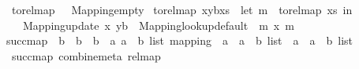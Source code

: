 \begin{isabellebody}
\ \ {\isachardoublequoteopen}to{\isacharunderscore}{\kern0pt}rel{\isacharunderscore}{\kern0pt}map\ {\isacharbrackleft}{\kern0pt}{\isacharbrackright}{\kern0pt}\ {\isacharequal}{\kern0pt}\ Mapping{\isachardot}{\kern0pt}empty{\isachardoublequoteclose}\isanewline
{\isacharbar}{\kern0pt}\ {\isachardoublequoteopen}to{\isacharunderscore}{\kern0pt}rel{\isacharunderscore}{\kern0pt}map\ {\isacharparenleft}{\kern0pt}{\isacharparenleft}{\kern0pt}{\isacharparenleft}{\kern0pt}x{\isacharcomma}{\kern0pt}y{\isacharparenright}{\kern0pt}{\isacharcomma}{\kern0pt}b{\isacharparenright}{\kern0pt}{\isacharhash}{\kern0pt}xs{\isacharparenright}{\kern0pt}\ {\isacharequal}{\kern0pt}\ {\isacharparenleft}{\kern0pt}let\ m\ {\isacharequal}{\kern0pt}\ to{\isacharunderscore}{\kern0pt}rel{\isacharunderscore}{\kern0pt}map\ xs\ in\isanewline
\ \ \ \ Mapping{\isachardot}{\kern0pt}update\ x\ {\isacharparenleft}{\kern0pt}{\isacharparenleft}{\kern0pt}y{\isacharcomma}{\kern0pt}b{\isacharparenright}{\kern0pt}\ {\isacharhash}{\kern0pt}\ Mapping{\isachardot}{\kern0pt}lookup{\isacharunderscore}{\kern0pt}default\ {\isacharbrackleft}{\kern0pt}{\isacharbrackright}{\kern0pt}\ m\ x{\isacharparenright}{\kern0pt}\ m{\isacharparenright}{\kern0pt}{\isachardoublequoteclose}\isanewline
\isanewline
{}\isamarkupfalse%
\ succ{\isacharunderscore}{\kern0pt}map\ {\isacharcolon}{\kern0pt}{\isacharcolon}{\kern0pt}\ {\isachardoublequoteopen}{\isacharparenleft}{\kern0pt}{\isacharprime}{\kern0pt}b\ {\isasymRightarrow}\ {\isacharprime}{\kern0pt}b\ {\isasymRightarrow}\ {\isacharprime}{\kern0pt}b{\isacharparenright}{\kern0pt}\ {\isasymRightarrow}\ {\isacharparenleft}{\kern0pt}{\isacharprime}{\kern0pt}a{\isacharcomma}{\kern0pt}\ {\isacharparenleft}{\kern0pt}{\isacharprime}{\kern0pt}a\ {\isacharasterisk}{\kern0pt}\ {\isacharprime}{\kern0pt}b{\isacharparenright}{\kern0pt}\ list{\isacharparenright}{\kern0pt}\ mapping\ {\isasymRightarrow}\ {\isacharparenleft}{\kern0pt}{\isacharparenleft}{\kern0pt}{\isacharprime}{\kern0pt}a\ {\isacharasterisk}{\kern0pt}\ {\isacharprime}{\kern0pt}a{\isacharparenright}{\kern0pt}\ {\isacharasterisk}{\kern0pt}\ {\isacharprime}{\kern0pt}b{\isacharparenright}{\kern0pt}\ list\ {\isasymRightarrow}\ {\isacharparenleft}{\kern0pt}{\isacharparenleft}{\kern0pt}{\isacharprime}{\kern0pt}a\ {\isacharasterisk}{\kern0pt}\ {\isacharprime}{\kern0pt}a{\isacharparenright}{\kern0pt}\ {\isacharasterisk}{\kern0pt}\ {\isacharprime}{\kern0pt}b{\isacharparenright}{\kern0pt}\ list{\isachardoublequoteclose}\ \isanewline
\ \ {\isachardoublequoteopen}succ{\isacharunderscore}{\kern0pt}map\ combine{\isacharunderscore}{\kern0pt}meta\ rel{\isacharunderscore}{\kern0pt}map\ {\isacharbrackleft}{\kern0pt}{\isacharbrackright}{\kern0pt}\ {\isacharequal}{\kern0pt}\ {\isacharbrackleft}{\kern0pt}{\isacharbrackright}{\kern0pt}{\isachardoublequoteclose}\isanewline

\end{isabellebody}
